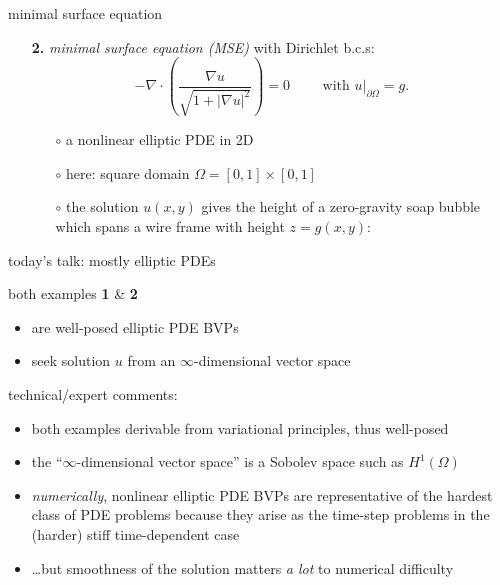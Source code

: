\documentclass[hide notes,intlimits,usenames,dvipsnames]{beamer}
\newcommand{\grad}{\nabla}
\begin{document}
\begin{frame}{minimal surface equation}

\begin{itemize}
\item[\textbf{2.}] \emph{minimal surface equation (MSE)} with Dirichlet b.c.s:
	    $$- \grad\cdot \left(\frac{\grad u}{\sqrt{1 + |\grad u|^2}}\right) = 0  \qquad \text{ with } u\big|_{\partial \Omega} = g.$$
    \vspace{-2mm}
	\begin{itemize}
	\item[$\circ$] a nonlinear elliptic PDE in 2D
	\item[$\circ$] here: square domain $\Omega = [0,1] \times [0,1]$
	\item[$\circ$] the solution $u(x,y)$ gives the height of a zero-gravity soap bubble which spans a wire frame with height $z=g(x,y)$:
	\end{itemize}

\begin{center}
\end{center}
\end{itemize}
\end{frame}


\begin{frame}{today's talk: mostly elliptic PDEs}

both examples {\color{Blue} \textbf{1}} \& {\color{Blue} \textbf{2}}
\begin{itemize}
\item are well-posed elliptic PDE BVPs
\item seek solution $u$ from an \alert{$\infty$-dimensional vector space}
\end{itemize}

\bigskip\bigskip

\scriptsize
technical/expert comments:
\begin{itemize}
\item both examples derivable from variational principles, thus well-posed
\item the ``$\infty$-dimensional vector space'' is a Sobolev space such as $H^1(\Omega)$
\item \emph{numerically}, nonlinear elliptic PDE BVPs are representative of the hardest class of PDE problems because they arise as the time-step problems in the (harder) stiff time-dependent case
\item \dots but smoothness of the solution matters \emph{a lot} to numerical difficulty
\end{itemize}
\end{frame}
\end{document}
